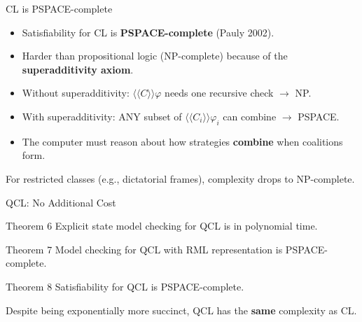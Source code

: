 \documentclass[aspectratio=169, 12pt]{beamer}
\begin{document}
\begin{frame}{CL is PSPACE-complete}
	\begin{itemize}
		\item Satisfiability for CL is \textbf{PSPACE-complete} (Pauly 2002).
		\item Harder than propositional logic (NP-complete) because of the \textbf{superadditivity axiom}.
		\item Without superadditivity: $\langle\!\langle C \rangle\!\rangle \varphi$ needs one recursive check $\rightarrow$ NP.
		\item With superadditivity: ANY subset of $\langle\!\langle C_i \rangle\!\rangle \varphi_i$ can combine $\rightarrow$ PSPACE.
		\item The computer must reason about how strategies \textbf{combine} when coalitions form.
	\end{itemize}

	\vspace{0.5em}
	For restricted classes (e.g., dictatorial frames), complexity drops to NP-complete.
\end{frame}


\begin{frame}{QCL: No Additional Cost}
	\begin{block}{Theorem 6}
		Explicit state model checking for QCL is in polynomial time.
	\end{block}

	\begin{block}{Theorem 7}
		Model checking for QCL with RML representation is PSPACE-complete.
	\end{block}

	\begin{block}{Theorem 8}
		Satisfiability for QCL is PSPACE-complete.
	\end{block}

	\vspace{0.5em}
	Despite being exponentially more succinct, QCL has the \textbf{same} complexity as CL.
\end{frame}
\end{document}
